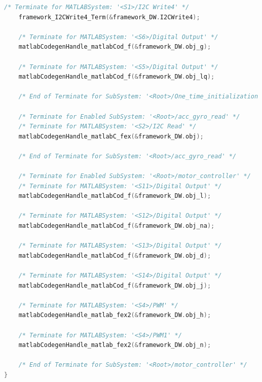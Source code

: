 \begin{lstlisting}[caption={Automatically generated C code}, language=c,firstnumber=698,label={lst:acg3}]
	/* Terminate for MATLABSystem: '<S1>/I2C Write4' */
	framework_I2CWrite4_Term(&framework_DW.I2CWrite4);
	
	/* Terminate for MATLABSystem: '<S6>/Digital Output' */
	matlabCodegenHandle_matlabCod_f(&framework_DW.obj_g);
	
	/* Terminate for MATLABSystem: '<S5>/Digital Output' */
	matlabCodegenHandle_matlabCod_f(&framework_DW.obj_lq);
	
	/* End of Terminate for SubSystem: '<Root>/One_time_initialization' */
	
	/* Terminate for Enabled SubSystem: '<Root>/acc_gyro_read' */
	/* Terminate for MATLABSystem: '<S2>/I2C Read' */
	matlabCodegenHandle_matlabC_fex(&framework_DW.obj);
	
	/* End of Terminate for SubSystem: '<Root>/acc_gyro_read' */
	
	/* Terminate for Enabled SubSystem: '<Root>/motor_controller' */
	/* Terminate for MATLABSystem: '<S11>/Digital Output' */
	matlabCodegenHandle_matlabCod_f(&framework_DW.obj_l);
	
	/* Terminate for MATLABSystem: '<S12>/Digital Output' */
	matlabCodegenHandle_matlabCod_f(&framework_DW.obj_na);
	
	/* Terminate for MATLABSystem: '<S13>/Digital Output' */
	matlabCodegenHandle_matlabCod_f(&framework_DW.obj_d);
	
	/* Terminate for MATLABSystem: '<S14>/Digital Output' */
	matlabCodegenHandle_matlabCod_f(&framework_DW.obj_j);
	
	/* Terminate for MATLABSystem: '<S4>/PWM' */
	matlabCodegenHandle_matlab_fex2(&framework_DW.obj_h);
	
	/* Terminate for MATLABSystem: '<S4>/PWM1' */
	matlabCodegenHandle_matlab_fex2(&framework_DW.obj_n);
	
	/* End of Terminate for SubSystem: '<Root>/motor_controller' */
}
\end{lstlisting}
